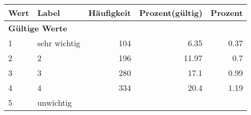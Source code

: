      \begin{longtable}{lXrrr}
     \toprule
     \textbf{Wert} & \textbf{Label} & \textbf{Häufigkeit} & \textbf{Prozent(gültig)} & \textbf{Prozent} \\
     \endhead
     \midrule
     \multicolumn{5}{l}{\textbf{Gültige Werte}}\\

     1 &
     \multicolumn{1}{X}{ sehr wichtig   } &


       \num{104} &
       \num[round-mode=places,round-precision=2]{6.35} &
         \num[round-mode=places,round-precision=2]{0.37} \\

     2 &
     \multicolumn{1}{X}{ 2   } &


       \num{196} &
       \num[round-mode=places,round-precision=2]{11.97} &
         \num[round-mode=places,round-precision=2]{0.7} \\

     3 &
     \multicolumn{1}{X}{ 3   } &


       \num{280} &
       \num[round-mode=places,round-precision=2]{17.1} &
         \num[round-mode=places,round-precision=2]{0.99} \\

     4 &
     \multicolumn{1}{X}{ 4   } &


       \num{334} &
       \num[round-mode=places,round-precision=2]{20.4} &
         \num[round-mode=places,round-precision=2]{1.19} \\

     5 &
     \multicolumn{1}{X}{ unwichtig   } &



\end{longtable}
